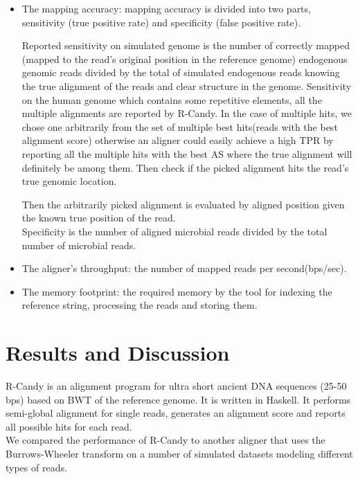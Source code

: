 \documentclass[11pt,a4paper]{report}
\begin{document}
\begin{itemize}

 \item The mapping accuracy: mapping accuracy is divided into two parts, 
 sensitivity (true positive rate) and specificity (false positive rate).

 Reported sensitivity on simulated genome is the number of correctly mapped
 (mapped to the read's original position in the reference genome) 
endogenous genomic reads divided by the total of simulated endogenous reads 
knowing the true alignment of the reads and clear structure in the genome.
Sensitivity on the human genome which contains some repetitive elements,
all the multiple alignments are reported by R-Candy.
In the case of multiple hits, we chose one arbitrarily from the set of 
multiple best hits(reads with the best alignment score) otherwise 
an aligner could easily achieve a high TPR by reporting all the multiple 
hits with the best AS where the true alignment will definitely be among them.
Then check if the picked alignment hits the read's true genomic location.

Then the arbitrarily picked alignment is evaluated 
by aligned position given the known true position of the read.\\


Specificity is the number of aligned  microbial reads 
divided by the total number of  microbial reads.

 \item The aligner's throughput: the number of mapped reads per second(bps/sec).

 \item The memory footprint: the required memory by the tool for indexing 
the reference string, processing the reads and storing them. 

\end{itemize}
 



\section{Results and Discussion} \label{Results and Discussion}

R-Candy is an alignment program for ultra short ancient DNA sequences 
(25-50 bps) based on BWT of the reference genome. It is  written in Haskell. 
It performs semi-global alignment for single reads, 
generates an alignment score and reports all possible hits for each read.
\\
We compared the performance of R-Candy to another aligner that 
uses the Burrows-Wheeler transform\cite{bwa} on a number of simulated 
datasets modeling different types of reads. 
\end{document}
